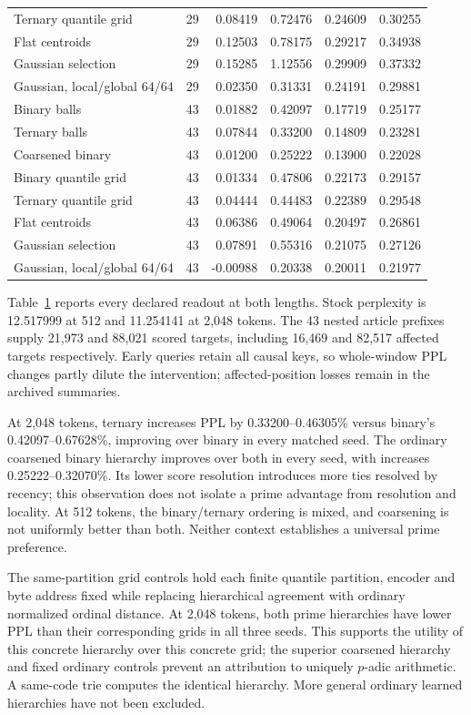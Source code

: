 \documentclass[11pt]{article}
\begin{document}
\begin{table}[tbp]
\begin{tabular}{lrrrrr}
Ternary quantile grid & 29 & 0.08419 & 0.72476 & 0.24609 & 0.30255\\
Flat centroids & 29 & 0.12503 & 0.78175 & 0.29217 & 0.34938\\
Gaussian selection & 29 & 0.15285 & 1.12556 & 0.29909 & 0.37332\\
Gaussian, local/global 64/64 & 29 & 0.02350 & 0.31331 & 0.24191 & 0.29881\\
\midrule
Binary balls & 43 & 0.01882 & 0.42097 & 0.17719 & 0.25177\\
Ternary balls & 43 & 0.07844 & 0.33200 & 0.14809 & 0.23281\\
Coarsened binary & 43 & 0.01200 & 0.25222 & 0.13900 & 0.22028\\
Binary quantile grid & 43 & 0.01334 & 0.47806 & 0.22173 & 0.29157\\
Ternary quantile grid & 43 & 0.04444 & 0.44483 & 0.22389 & 0.29548\\
Flat centroids & 43 & 0.06386 & 0.49064 & 0.20497 & 0.26861\\
Gaussian selection & 43 & 0.07891 & 0.55316 & 0.21075 & 0.27126\\
Gaussian, local/global 64/64 & 43 & -0.00988 & 0.20338 & 0.20011 & 0.21977\\
\bottomrule
\end{tabular}
\label{tab:shared-development}
\end{table}

Table~\ref{tab:shared-development} reports every declared readout at both
lengths. Stock perplexity is 12.517999 at 512 and 11.254141 at 2,048 tokens.
The 43 nested article prefixes supply 21,973 and 88,021 scored targets,
including 16,469 and 82,517 affected targets respectively. Early queries
retain all causal keys, so whole-window PPL changes partly dilute the
intervention; affected-position losses remain in the archived summaries.

At 2,048 tokens, ternary increases PPL by 0.33200--0.46305\% versus
binary's 0.42097--0.67628\%, improving over binary in every matched seed.
The ordinary coarsened binary hierarchy improves over both in every seed,
with increases 0.25222--0.32070\%. Its lower score resolution introduces
more ties resolved by recency; this observation does not isolate a prime
advantage from resolution and locality. At 512 tokens, the binary/ternary
ordering is mixed, and coarsening is not uniformly better than both.
Neither context establishes a universal prime preference.

The same-partition grid controls hold each finite quantile partition,
encoder and byte address fixed while replacing hierarchical agreement with
ordinary normalized ordinal distance. At 2,048 tokens, both prime hierarchies
have lower PPL than their corresponding grids in all three seeds. This
supports the utility of this concrete hierarchy over this concrete grid;
the superior coarsened hierarchy and fixed ordinary controls prevent an
attribution to uniquely \(p\)-adic arithmetic. A same-code trie computes the
identical hierarchy. More general ordinary learned hierarchies have not
been excluded.
\end{document}
